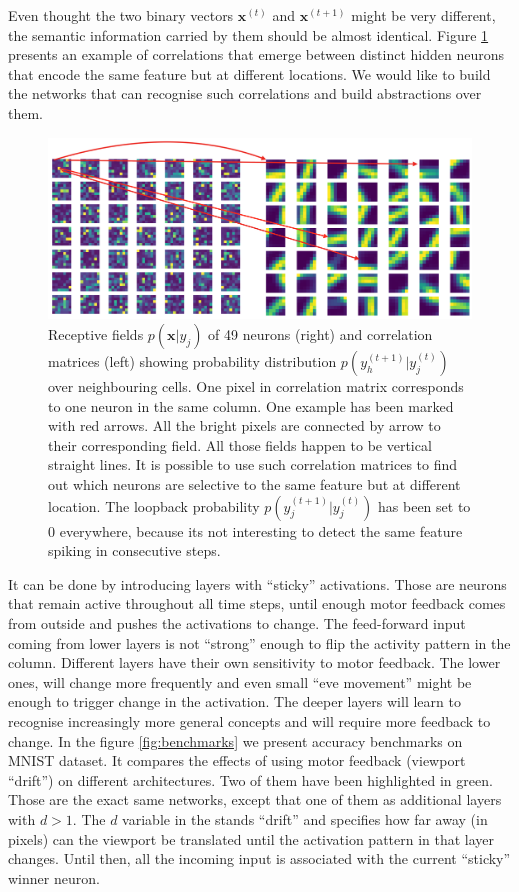 \documentclass[12pt]{article}
\begin{document}
Even thought the two binary vectors $\boldsymbol{x}^{(t)}$ and $\boldsymbol{x}^{(t+1)}$ might be very different, the semantic information carried by them should be almost identical. Figure \ref{fig:motor_drift} presents an example of correlations that emerge between distinct hidden neurons that encode the same feature but at different locations. We would like to build the networks that can recognise such correlations and build abstractions over them. 
\begin{figure}[!htbp]
	\centering
	\includegraphics[width=13.8cm]{motor_drift}
	\caption{Receptive fields $p(\boldsymbol{x}|y_j)$ of 49 neurons (right) and correlation matrices (left) showing probability distribution $p(y_h^{(t+1)}|y_j^{(t)})$ over neighbouring cells. One pixel in correlation matrix corresponds to one neuron in the same column. One example has been marked with red arrows. All the bright pixels are connected by arrow to their corresponding field. All those fields happen to be vertical straight lines. It is possible to use such correlation matrices to find out which neurons are selective to the same feature but at different location. The loopback probability $p(y_j^{(t+1)}|y_j^{(t)})$ has been set to $0$ everywhere, because its not interesting to detect the same feature spiking in consecutive steps.}
	\label{fig:motor_drift}
\end{figure} 
It can be done by introducing layers with ``sticky'' activations. Those are neurons that remain active throughout all time steps, until enough motor feedback comes from outside and pushes the activations to change. The feed-forward input coming from lower layers is not ``strong'' enough to flip the activity pattern in the column. Different layers have their own sensitivity to motor feedback. The lower ones, will change more frequently and even small ``eve movement'' might be enough to trigger change in the activation. The deeper layers will learn to recognise increasingly more general concepts and will require more feedback to change. In the figure \ref{fig:benchmarks} we present accuracy benchmarks on MNIST dataset. It compares the effects of using  motor feedback (viewport ``drift'') on different architectures. Two of them have been highlighted in green. Those are the exact same networks, except that one of them as additional layers with $d>1$. The $d$ variable in the stands ``drift'' and specifies how far away (in pixels) can the viewport be translated until the activation pattern in that layer changes. Until then, all the incoming input is associated with the current ``sticky'' winner neuron. 
\end{document}
